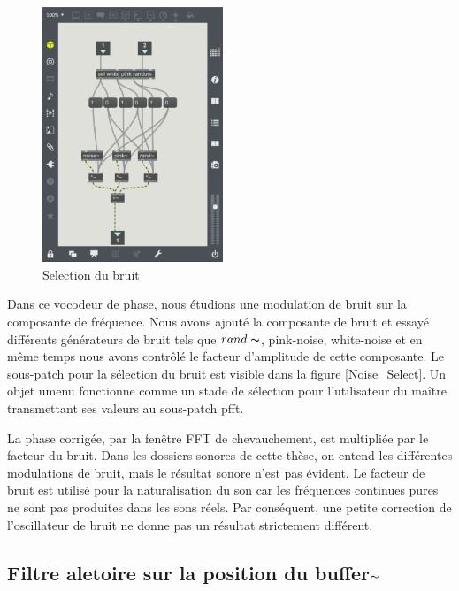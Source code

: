 \begin{figure}
  \vspace{-20pt}
  \begin{center}
    \includegraphics[width=0.48\textwidth]{Graphs/Noise_Select.png}
  \end{center}
  \vspace{-20pt}
  \caption{Selection du bruit}
  \vspace{-10pt}
\end{figure}

    Dans ce vocodeur de phase, nous étudions une modulation de bruit sur la composante de fréquence. Nous avons ajouté la composante de bruit et essayé différents générateurs de bruit tels que $ rand \thicksim $, pink-noise, white-noise et en même temps nous avons contrôlé le facteur d'amplitude de cette composante. Le sous-patch pour la sélection du bruit est visible dans la figure \ref{Noise_Select}. Un objet umenu fonctionne comme un stade de sélection pour l'utilisateur du maître transmettant ses valeurs au sous-patch pfft.

    La phase corrigée, par la fenêtre FFT de chevauchement, est multipliée par le facteur du bruit. Dans les dossiers sonores de cette thèse, on entend les différentes modulations de bruit, mais le résultat sonore n’est pas évident. Le facteur de bruit est utilisé pour la naturalisation du son car les fréquences continues pures ne sont pas produites dans les sons réels. Par conséquent, une petite correction de l'oscillateur de bruit ne donne pas un résultat strictement différent.

\subsection{Filtre aletoire sur la position du buffer$\thicksim$}

